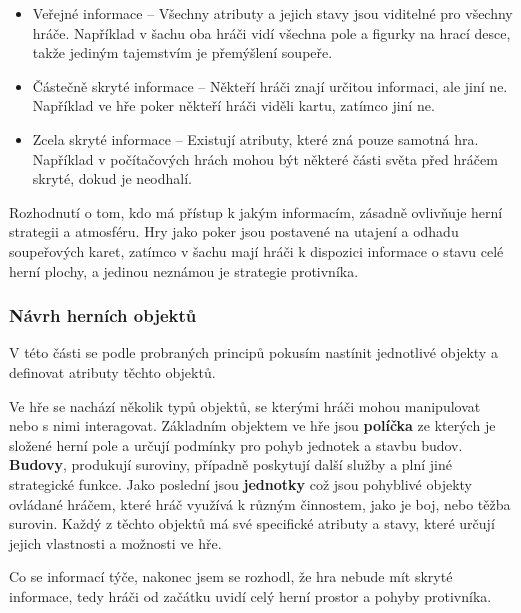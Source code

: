 \begin{itemize}
    \item Veřejné informace -- Všechny atributy a jejich stavy jsou viditelné pro všechny hráče. Například v šachu oba hráči vidí všechna pole a figurky na hrací desce, takže jediným tajemstvím je přemýšlení soupeře.
    \item Částečně skryté informace -- Někteří hráči znají určitou informaci, ale jiní ne. Například ve hře poker někteří hráči viděli kartu, zatímco jiní ne.
    \item Zcela skryté informace -- Existují atributy, které zná pouze samotná hra. Například v počítačových hrách mohou být některé části světa před hráčem skryté, dokud je neodhalí.
\end{itemize}

Rozhodnutí o tom, kdo má přístup k jakým informacím, zásadně ovlivňuje herní strategii a atmosféru. Hry jako poker jsou postavené na utajení a odhadu soupeřových karet, zatímco v šachu mají hráči k dispozici informace o stavu celé herní plochy, a jedinou neznámou je strategie protivníka.

\subsubsection{Návrh herních objektů}

V této části se podle probraných principů pokusím nastínit jednotlivé objekty a definovat atributy těchto objektů.

Ve hře se nachází několik typů objektů, se kterými hráči mohou manipulovat nebo s nimi interagovat. Základním objektem ve hře jsou \textbf{políčka} ze kterých je složené herní pole a určují podmínky pro pohyb jednotek a stavbu budov. \textbf{Budovy}, produkují suroviny, případně poskytují další služby a plní jiné strategické funkce. Jako poslední jsou \textbf{jednotky} což jsou pohyblivé objekty ovládané hráčem, které hráč využívá k různým činnostem, jako je boj, nebo těžba surovin. Každý z těchto objektů má své specifické atributy a stavy, které určují jejich vlastnosti a možnosti ve hře.

Co se informací týče, nakonec jsem se rozhodl, že hra nebude mít skryté informace, tedy hráči od začátku uvidí celý herní prostor a pohyby protivníka.


